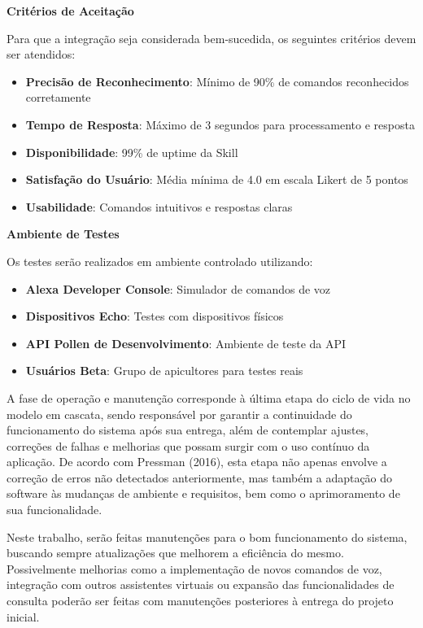 \textbf{Critérios de Aceitação}

Para que a integração seja considerada bem-sucedida, os seguintes critérios devem ser atendidos:

\begin{itemize}
    \item \textbf{Precisão de Reconhecimento}: Mínimo de 90\% de comandos reconhecidos corretamente
    \item \textbf{Tempo de Resposta}: Máximo de 3 segundos para processamento e resposta
    \item \textbf{Disponibilidade}: 99\% de uptime da Skill
    \item \textbf{Satisfação do Usuário}: Média mínima de 4.0 em escala Likert de 5 pontos
    \item \textbf{Usabilidade}: Comandos intuitivos e respostas claras
\end{itemize}

\textbf{Ambiente de Testes}

Os testes serão realizados em ambiente controlado utilizando:

\begin{itemize}
    \item \textbf{Alexa Developer Console}: Simulador de comandos de voz
    \item \textbf{Dispositivos Echo}: Testes com dispositivos físicos
    \item \textbf{API Pollen de Desenvolvimento}: Ambiente de teste da API
    \item \textbf{Usuários Beta}: Grupo de apicultores para testes reais
\end{itemize}

\label{sssec:operação}

A fase de operação e manutenção corresponde à última etapa do ciclo de vida no modelo em cascata, sendo responsável por garantir a continuidade do funcionamento do sistema após sua entrega, 
além de contemplar ajustes, correções de falhas e melhorias que possam surgir com o uso contínuo da aplicação. De acordo com Pressman (2016), esta etapa não apenas envolve a correção de erros não detectados anteriormente, 
mas também a adaptação do software às mudanças de ambiente e requisitos, bem como o aprimoramento de sua funcionalidade.

Neste trabalho, serão feitas manutenções para o bom funcionamento do sistema, buscando sempre atualizações que melhorem a eficiência do mesmo. 
Possivelmente melhorias como a implementação de novos comandos de voz, integração com outros assistentes virtuais ou expansão das funcionalidades de consulta poderão ser feitas com manutenções posteriores à entrega do projeto inicial.

